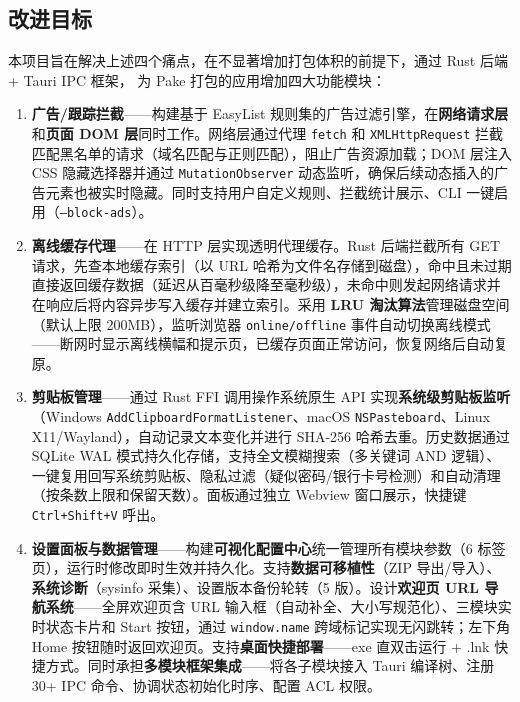 \documentclass[12pt,a4paper]{ctexart}
\begin{document}
\subsection{改进目标}

本项目旨在解决上述四个痛点，在不显著增加打包体积的前提下，通过 Rust 后端 + Tauri IPC 框架，
为 Pake 打包的应用增加四大功能模块：

\begin{enumerate}[label=(\arabic*), leftmargin=1.5cm]

  \item \textbf{广告/跟踪拦截}——构建基于 EasyList 规则集的广告过滤引擎，在\textbf{网络请求层}和\textbf{页面 DOM 层}同时工作。网络层通过代理 \texttt{fetch} 和 \texttt{XMLHttpRequest} 拦截匹配黑名单的请求（域名匹配与正则匹配），阻止广告资源加载；DOM 层注入 CSS 隐藏选择器并通过 \texttt{MutationObserver} 动态监听，确保后续动态插入的广告元素也被实时隐藏。同时支持用户自定义规则、拦截统计展示、CLI 一键启用（\texttt{--block-ads}）。

  \item \textbf{离线缓存代理}——在 HTTP 层实现透明代理缓存。Rust 后端拦截所有 GET 请求，先查本地缓存索引（以 URL 哈希为文件名存储到磁盘），命中且未过期直接返回缓存数据（延迟从百毫秒级降至毫秒级），未命中则发起网络请求并在响应后将内容异步写入缓存并建立索引。采用 \textbf{LRU 淘汰算法}管理磁盘空间（默认上限 200MB），监听浏览器 \texttt{online/offline} 事件自动切换离线模式——断网时显示离线横幅和提示页，已缓存页面正常访问，恢复网络后自动复原。

  \item \textbf{剪贴板管理}——通过 Rust FFI 调用操作系统原生 API 实现\textbf{系统级剪贴板监听}（Windows \texttt{AddClipboardFormatListener}、macOS \texttt{NSPasteboard}、Linux X11/Wayland），自动记录文本变化并进行 SHA-256 哈希去重。历史数据通过 SQLite WAL 模式持久化存储，支持全文模糊搜索（多关键词 AND 逻辑）、一键复用回写系统剪贴板、隐私过滤（疑似密码/银行卡号检测）和自动清理（按条数上限和保留天数）。面板通过独立 Webview 窗口展示，快捷键 \texttt{Ctrl+Shift+V} 呼出。

  \item \textbf{设置面板与数据管理}——构建\textbf{可视化配置中心}统一管理所有模块参数（6 标签页），运行时修改即时生效并持久化。支持\textbf{数据可移植性}（ZIP 导出/导入）、\textbf{系统诊断}（sysinfo 采集）、设置版本备份轮转（5 版）。设计\textbf{欢迎页 URL 导航系统}——全屏欢迎页含 URL 输入框（自动补全、大小写规范化）、三模块实时状态卡片和 Start 按钮，通过 \texttt{window.name} 跨域标记实现无闪跳转；左下角 Home 按钮随时返回欢迎页。支持\textbf{桌面快捷部署}——exe 直双击运行 + .lnk 快捷方式。同时承担\textbf{多模块框架集成}——将各子模块接入 Tauri 编译树、注册 30+ IPC 命令、协调状态初始化时序、配置 ACL 权限。

\end{enumerate}
\end{document}
